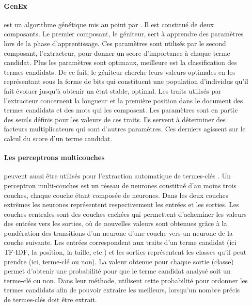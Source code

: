       \paragraph{GenEx}
        est un algorithme génétique mis au point par
        \citet{turney1999learningalgorithms}. Il est constitué de deux composants.
        Le premier composant, le géniteur, sert à apprendre des paramètres lors de
        la phase d'apprentissage. Ces paramètres sont utilisés par le second
        composant, l'extracteur, pour donner un score d'importance à chaque terme
        candidat. Plus les paramètres sont optimaux, meilleure est la
        classification des termes candidats. De ce fait, le géniteur cherche leurs valeurs
        optimales en les représentant sous la forme de bits qui constituent une
        population d'individus qu'il fait évoluer jusqu'à obtenir un état stable,
        optimal. Les traits utilisés par l'extracteur concernent la longueur et la
        première position dans le document des termes candidats et des mots qui
        les composent. Les paramètres sont en partie des seuils définis pour les
        valeurs de ces traits. Ils servent à déterminer des facteurs
        multiplicateurs qui sont d'autres paramètres. Ces derniers agissent sur le
        calcul du score d'un terme candidat.

      \paragraph{Les perceptrons multicouches}
        peuvent aussi être utilisés pour l'extraction automatique de termes-clés
        \citep{sarkar2010neuralnetwork}. Un perceptron multi-couches est un réseau
        de neurones constitué d'au moins trois couches, chaque couche étant
        composée de neurones. Dans les deux couches extrêmes les neurones
        représentent respectivement les entrées et les sorties. Les couches
        centrales sont des couches cachées qui permettent d'acheminer les valeurs
        des entrées vers les sorties, où de nouvelles valeurs sont obtenues grâce
        à la pondération des transitions d'un neurone d'une couche vers un neurone
        de la couche suivante. Les entrées correspondent aux traits d'un terme
        candidat (ici TF-IDF, la position, la taille, etc.) et les sorties
        représentent les classes qu'il peut prendre (ici, terme-clé ou non). La
        valeur obtenue pour chaque sortie (classe) permet d'obtenir une
        probabilité pour que le terme candidat analysé soit un terme-clé ou non.
        Dans leur méthode, \citet{sarkar2010neuralnetwork} utilisent cette
        probabilité pour ordonner les termes candidats afin de pouvoir extraire
        les meilleurs, lorsqu'un nombre précis de termes-clés doit être extrait.

